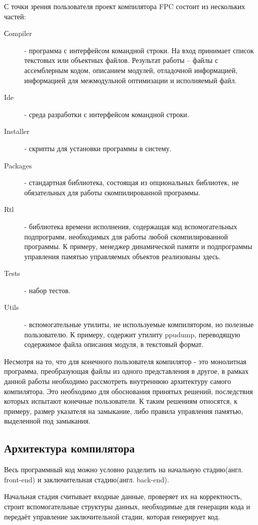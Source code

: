 \documentclass{imcs}
\begin{document}
С точки зрения пользователя проект компилятора FPC состоит из нескольких 
частей:
\begin{description}
    \item[Сompiler] - программа с интерфейсом командной строки. На вход
принимает список текстовых или объектных файлов. Результат работы --
файлы с ассемблерным кодом, описанием модулей, отладочной информацией,
информацией для межмодульной оптимизации и исполняемый файл.
    \item[Ide] - среда разработки с интерфейсом командной строки.
    \item[Installer] - скрипты для установки программы в систему.
    \item[Packages] - стандартная библиотека, состоящая из опциональных
библиотек, не обязательных для работы скомпилированной программы.
    \item[Rtl] - библиотека времени исполнения, содержащая код вспомогательных
подпрограмм, необходимых для работы любой скомпилированной программы. К 
примеру, менеджер динамической памяти и подпрограммы управления памятью
управляемых объектов реализованы здесь.
    \item[Tests] - набор тестов.
    \item[Utils] - вспомогательные утилиты, не используемые компилятором,
но полезные пользователю. К примеру, содержит утилиту ppudump, переводящую
содержимое файла описания модуля, в текстовый формат.
\end{description}

Несмотря на то, что для конечного пользователя компилятор - это монолитная
программа, преобразующая файлы из одного представления в другое, в рамках
данной работы необходимо рассмотреть внутреннюю архитектуру самого компилятора.
Это необходимо для обоснования принятых решений, последствия которых 
испытают конечные пользователи. К таким решениям относятся, к примеру,
размер указателя на замыкание, либо правила управления памятью,
выделенной под замыкания.

\subsection{Архитектура компилятора}

Весь программный код можно условно разделить на начальную стадию(англ. front-end)
и заключительная стадию(англ. back-end)\cite{dragonbook}.

Начальная стадия считывает входные данные, проверяет их на корректность, строит
вспомогательные структуры данных, необходимые для генерации кода и передаёт 
управление заключительной стадии, которая генерирует код.
\end{document}
